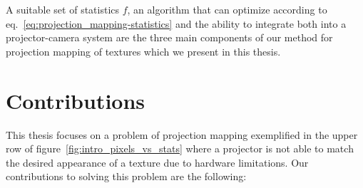 A suitable set of statistics \(f\), an algorithm that can optimize according to eq.~\ref{eq:projection_mapping-statistics} and the ability to integrate both into a projector-camera system are the three main components of our method for projection mapping of textures which we present in this thesis.

\section{Contributions}
\label{section:intro-contributions}

This thesis focuses on a problem of projection mapping exemplified in the upper row of figure~\ref{fig:intro_pixels_vs_stats} where a projector is not able to match the desired appearance of a texture due to hardware limitations. Our contributions to solving this problem are the following:

